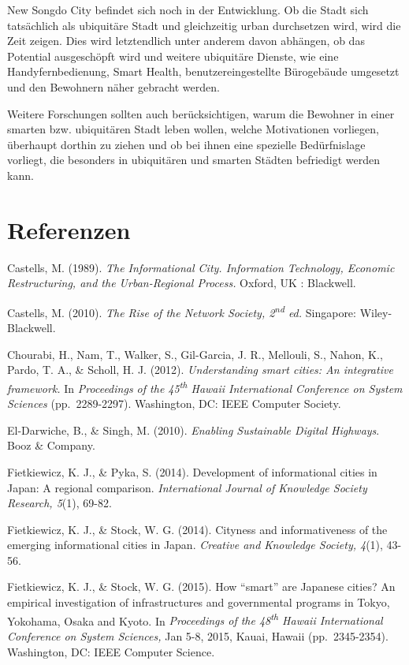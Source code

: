 \documentclass[a4paper,
fontsize=11pt,
oneside,
numbers=noperiodatend,
parskip=half-,
bibliography=totoc,
final
]{scrartcl}
\begin{document}
New Songdo City befindet sich noch in der Entwicklung. Ob die Stadt sich
tatsächlich als ubiquitäre Stadt und gleichzeitig urban durchsetzen
wird, wird die Zeit zeigen. Dies wird letztendlich unter anderem davon
abhängen, ob das Potential ausgeschöpft wird und weitere ubiquitäre
Dienste, wie eine Handyfernbedienung, Smart Health, benutzereingestellte
Bürogebäude umgesetzt und den Bewohnern näher gebracht werden.

Weitere Forschungen sollten auch berücksichtigen, warum die Bewohner in
einer smarten bzw. ubiquitären Stadt leben wollen, welche Motivationen
vorliegen, überhaupt dorthin zu ziehen und ob bei ihnen eine spezielle
Bedürfnislage vorliegt, die besonders in ubiquitären und smarten Städten
befriedigt werden kann.

\section*{Referenzen}\label{referenzen}

Castells, M. (1989). \emph{The Informational City. Information
Technology, Economic Restructuring, and the Urban-Regional Process.}
Oxford, UK : Blackwell.

Castells, M. (2010). \emph{The Rise of the Network Society,
2\textsuperscript{nd} ed.} Singapore: Wiley-Blackwell.

Chourabi, H., Nam, T., Walker, S., Gil-Garcia, J. R., Mellouli, S.,
Nahon, K., Pardo, T. A., \& Scholl, H. J. (2012). \emph{Understanding
smart cities: An integrative framework.} In \emph{Proceedings of the
45\textsuperscript{th} Hawaii International Conference on System
Sciences} (pp.~2289-2297). Washington, DC: IEEE Computer Society.

El-Darwiche, B., \& Singh, M. (2010). \emph{Enabling Sustainable Digital
Highways}. Booz \& Company.

Fietkiewicz, K. J., \& Pyka, S. (2014). Development of informational
cities in Japan: A regional comparison. \emph{International Journal of
Knowledge Society Research, 5}(1), 69-82.

Fietkiewicz, K. J., \& Stock, W. G. (2014). Cityness and informativeness
of the emerging informational cities in Japan. \emph{Creative and
Knowledge Society, 4}(1), 43-56.

Fietkiewicz, K. J., \& Stock, W. G. (2015). How \enquote{smart} are
Japanese cities? An empirical investigation of infrastructures and
governmental programs in Tokyo, Yokohama, Osaka and Kyoto. In
\emph{Proceedings of the 48\textsuperscript{th} Hawaii International
Conference on System Sciences,} Jan 5-8, 2015, Kauai, Hawaii
(pp.~2345-2354). Washington, DC: IEEE Computer Science.
\end{document}
